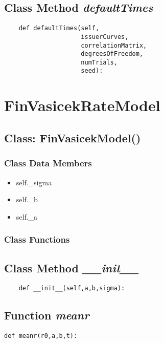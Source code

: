 \documentclass[twoside,11pt]{book}
\begin{document}
\subsection{Class Method {\it defaultTimes}}


\begin{lstlisting}
    def defaultTimes(self, 
                     issuerCurves, 
                     correlationMatrix, 
                     degreesOfFreedom,
                     numTrials, 
                     seed):
\end{lstlisting}

\newpage
\section{FinVasicekRateModel}

\subsection{Class: FinVasicekModel()}


\subsubsection{Class Data Members}
\begin{itemize}
\item{self.\_sigma}
\item{self.\_b}
\item{self.\_a}
\end{itemize}

\subsubsection{Class Functions}

\subsection{Class Method {\it \_\_init\_\_}}


\begin{lstlisting}
    def __init__(self,a,b,sigma):
\end{lstlisting}

\subsection{Function {\it meanr}}


\begin{lstlisting}
def meanr(r0,a,b,t):
\end{lstlisting}
\end{document}
